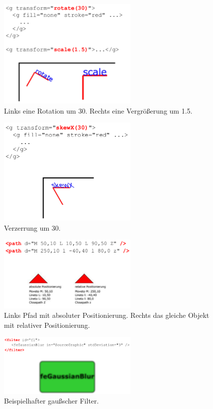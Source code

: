 \begin{figure}[h]\centering
\includegraphics[width=0.6\textwidth]{pictures/rot_scal.png}
\caption{Links eine Rotation um 30. Rechts eine Vergrößerung um 1.5.}
\label{fig:rot}
\end{figure}
\begin{figure}[h]\centering
\includegraphics[width=0.6\textwidth]{pictures/skew.png}
\caption{Verzerrung um 30.}
\label{fig:skew}
\end{figure}
\begin{figure}[h]\centering
\includegraphics[width=0.6\textwidth]{pictures/path.png}
\caption{Links Pfad mit absoluter Positionierung. Rechts das gleiche Objekt mit relativer Positionierung.}
\label{fig:path}
\end{figure}
\begin{figure}[h]\centering
\includegraphics[width=0.6\textwidth]{pictures/filter.png}
\caption{Beispielhafter gaußscher Filter.}
\label{fig:filter}
\end{figure}
